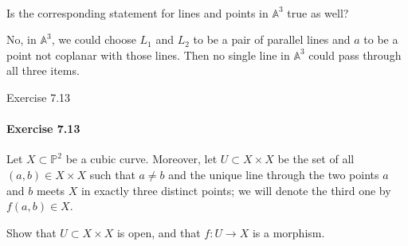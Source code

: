 \documentclass[12pt]{article}
\newenvironment{fullbox}{\begin{lrbox}{\savefullbox}\begin{minipage}{\dimexpr\textwidth-2\fboxsep\relax}}{\end{minipage}\end{lrbox}\begin{center}\framebox[\textwidth]{\usebox{\savefullbox}}\end{center}}
\newenvironment{pbox}[1][]{\begin{fullbox}\ifx#1\empty\else\paragraph{#1}\fi}{\end{fullbox}}
\newcommand{\<}{\langle}
\renewcommand{\>}{\rangle}
\newcommand{\A}{\mathbb{A}}
\renewcommand{\P}{\mathbb{P}}
\begin{document}
\begin{pbox}
    Is the corresponding statement for lines and points in $\A^3$ true as well?
\end{pbox}

No, in $\A^3$, we could choose $L_1$ and $L_2$ to be a pair of parallel lines and $a$ to be a point not coplanar with those lines. Then no single line in $\A^3$ could pass through all three items.




\newpage
\begin{pbox}[Exercise 7.13]
    Let $X \subset \P^2$ be a cubic curve. Moreover, let $U \subset X \times X$ be the set of all $(a, b) \in X \times X$ such that $a \ne b$ and the unique line through the two points $a$ and $b$ meets $X$ in exactly three distinct points; we will denote the third one by $f(a, b) \in X$.

    Show that $U \subset X \times X$ is open, and that $f : U \to X$ is a morphism.
\end{pbox}
\end{document}
